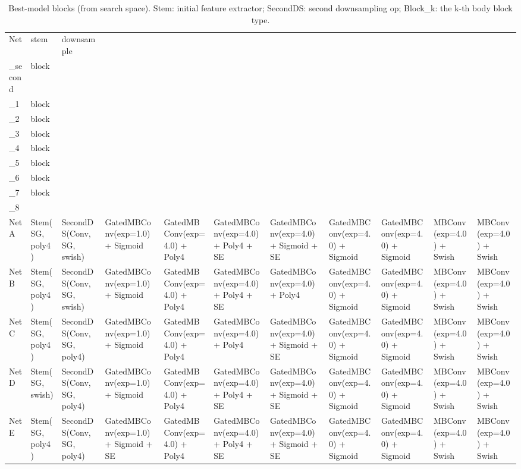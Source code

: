 \begin{table}[t]
\caption{Best-model blocks (from search space). Stem: initial feature extractor; SecondDS: second downsampling op; Block\_k: the k-th body block type.}
\label{tab:best-models-blocks}
\centering
\setlength{\tabcolsep}{3pt}
\renewcommand{\arraystretch}{1.1}
\begin{tabular}{l p{2.2cm} p{2.8cm} p{2.2cm} p{2.2cm} p{2.2cm} p{2.2cm} p{2.2cm} p{2.2cm} p{2.2cm} p{2.2cm}}
\toprule
Net & stem & downsample\\_second & block\\_1 & block\\_2 & block\\_3 & block\\_4 & block\\_5 & block\\_6 & block\\_7 & block\\_8 \\
\midrule
Net A & Stem(SG, poly4) & SecondDS(Conv, SG, swish) & GatedMBConv(exp=1.0) + Sigmoid & GatedMBConv(exp=4.0) + Poly4 & GatedMBConv(exp=4.0) + Poly4 + SE & GatedMBConv(exp=4.0) + Sigmoid + SE & GatedMBConv(exp=4.0) + Sigmoid & GatedMBConv(exp=4.0) + Sigmoid & MBConv(exp=4.0) + Swish & MBConv(exp=4.0) + Swish \\
Net B & Stem(SG, poly4) & SecondDS(Conv, SG, swish) & GatedMBConv(exp=1.0) + Sigmoid & GatedMBConv(exp=4.0) + Poly4 & GatedMBConv(exp=4.0) + Poly4 + SE & GatedMBConv(exp=4.0) + Poly4 & GatedMBConv(exp=4.0) + Sigmoid & GatedMBConv(exp=4.0) + Sigmoid & MBConv(exp=4.0) + Swish & MBConv(exp=4.0) + Swish \\
Net C & Stem(SG, poly4) & SecondDS(Conv, SG, poly4) & GatedMBConv(exp=1.0) + Sigmoid & GatedMBConv(exp=4.0) + Poly4 & GatedMBConv(exp=4.0) + Poly4 & GatedMBConv(exp=4.0) + Sigmoid + SE & GatedMBConv(exp=4.0) + Sigmoid & GatedMBConv(exp=4.0) + Sigmoid & MBConv(exp=4.0) + Swish & MBConv(exp=4.0) + Swish \\
Net D & Stem(SG, swish) & SecondDS(Conv, SG, poly4) & GatedMBConv(exp=1.0) + Sigmoid & GatedMBConv(exp=4.0) + Poly4 & GatedMBConv(exp=4.0) + Poly4 + SE & GatedMBConv(exp=4.0) + Sigmoid + SE & GatedMBConv(exp=4.0) + Sigmoid & GatedMBConv(exp=4.0) + Sigmoid & MBConv(exp=4.0) + Swish & MBConv(exp=4.0) + Swish \\
Net E & Stem(SG, poly4) & SecondDS(Conv, SG, poly4) & GatedMBConv(exp=1.0) + Sigmoid + SE & GatedMBConv(exp=4.0) + Poly4 & GatedMBConv(exp=4.0) + Poly4 + SE & GatedMBConv(exp=4.0) + Sigmoid + SE & GatedMBConv(exp=4.0) + Sigmoid & GatedMBConv(exp=4.0) + Sigmoid & MBConv(exp=4.0) + Swish & MBConv(exp=4.0) + Swish \\
\bottomrule
\end{tabular}
\end{table}
